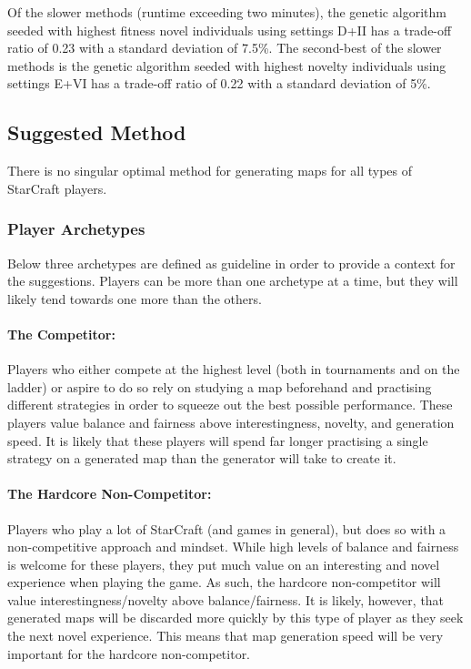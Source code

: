 Of the slower methods (runtime exceeding two minutes), the genetic algorithm seeded with highest fitness novel individuals using settings D+II has a trade-off ratio of 0.23 with a standard deviation of 7.5\%. The second-best of the slower methods is the genetic algorithm seeded with highest novelty individuals using settings E+VI has a trade-off ratio of 0.22 with a standard deviation of 5\%.

\subsection{Suggested Method}
\label{discussion_comparison_suggestedmethod}
There is no singular optimal method for generating maps for all types of StarCraft players. 

\subsubsection{Player Archetypes}
Below three archetypes are defined as guideline in order to provide a context for the suggestions. Players can be more than one archetype at a time, but they will likely tend towards one more than the others.

\paragraph{The Competitor:} Players who either compete at the highest level (both in tournaments and on the ladder) or aspire to do so rely on studying a map beforehand and practising different strategies in order to squeeze out the best possible performance. These players value balance and fairness above interestingness, novelty, and generation speed. It is likely that these players will spend far longer practising a single strategy on a generated map than the generator will take to create it.

\paragraph{The Hardcore Non-Competitor:} Players who play a lot of StarCraft (and games in general), but does so with a non-competitive approach and mindset. While high levels of balance and fairness is welcome for these players, they put much value on an interesting and novel experience when playing the game. As such, the hardcore non-competitor will value interestingness/novelty above balance/fairness. It is likely, however, that generated maps will be discarded more quickly by this type of player as they seek the next novel experience. This means that map generation speed will be very important for the hardcore non-competitor.

